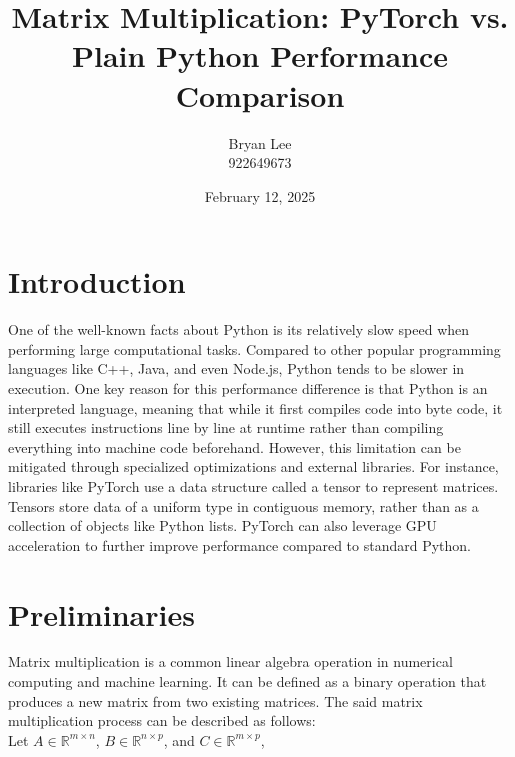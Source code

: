 \documentclass[12pt]{article}
\title{Matrix Multiplication: PyTorch vs. Plain Python Performance Comparison}
\author{Bryan Lee\\922649673}
\date{February 12, 2025}
\begin{document}
\maketitle
\thispagestyle{fancy}

\section{Introduction}
One of the well-known facts about Python is its relatively slow speed when performing large computational tasks.
Compared to other popular programming languages like C++, Java, and even Node.js, Python tends to be slower in execution.
One key reason for this performance difference is that Python is an interpreted language, meaning that while it first compiles code into byte code,
it still executes instructions line by line at runtime rather than compiling everything into machine code beforehand.
However, this limitation can be mitigated through specialized optimizations and external libraries.
For instance, libraries like PyTorch use a data structure called a tensor to represent matrices.
Tensors store data of a uniform type in contiguous memory, rather than as a collection of objects like Python lists.
PyTorch can also leverage GPU acceleration to further improve performance compared to standard Python.

\section{Preliminaries}
Matrix multiplication is a common linear algebra operation in numerical computing and machine learning.
It can be defined as a binary operation that produces a new matrix from two existing matrices.
The said matrix multiplication process can be described as follows: \\

\noindent Let $A \in \mathbb{R}^{m \times n}$, $B \in \mathbb{R}^{n \times p}$, and $C \in \mathbb{R}^{m \times p}$,
\end{document}
